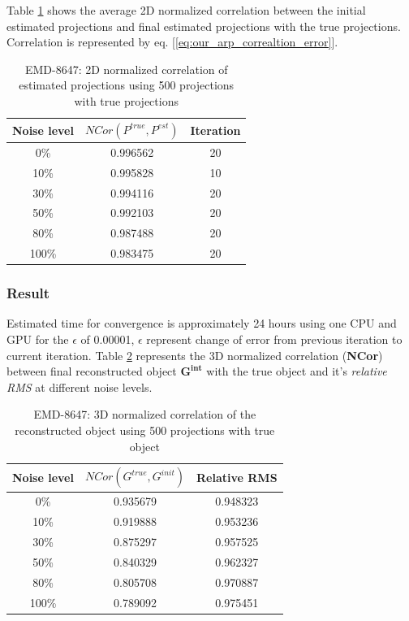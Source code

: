 \documentclass{report}
\begin{document}
Table \ref{tbl:our_shapr_8647_result-2d-correlation} shows the average 2D normalized correlation between the initial estimated projections and final estimated projections with the true projections. Correlation is represented by eq. [\ref{eq:our_arp_correaltion_error}]. 

\begin{table}[H]
    \centering
     \begin{tabular}{||c c c ||} 
             \hline
             Noise level & $ NCor(P^{true},P^{est})$ &  Iteration \\
             \hline\hline
            0\%   &0.996562 & 20 \\ \hline
            10\%  &0.995828 & 10 \\ \hline
            30\%  &0.994116 & 20 \\ \hline
            50\%  &0.992103 & 20 \\ \hline
            80\%  &0.987488 & 20 \\ \hline
            100\% &0.983475 & 20 \\ \hline
            \hline
    \end{tabular}
    \caption{EMD-8647: 2D normalized correlation of estimated projections using 500 projections with true projections }
    \label{tbl:our_shapr_8647_result-2d-correlation}
\end{table}

\subsubsection{Result}

Estimated time for convergence is approximately 24 hours using one CPU and GPU for the $\epsilon$  of 0.00001, $\epsilon$ represent change of error from previous iteration to current iteration. Table \ref{tbl:our_sharp_8674_result-3d-correlation} represents the 3D normalized correlation (\textbf{NCor}) between final reconstructed object $\boldsymbol{G^{int}}$ with the true object and it's \textit{relative RMS} at different noise levels. 

\begin{table}[H]
    \centering
     \begin{tabular}{||c c c||} 
             \hline
             Noise level & $NCor(G^{true},G^{init})$  &  Relative RMS \\ 
             \hline\hline
            0\%   &0.935679 & 0.948323 \\\hline
            10\%  &0.919888 & 0.953236 \\\hline 
            30\%  &0.875297 & 0.957525 \\\hline
            50\%  &0.840329 & 0.962327 \\\hline
            80\%  &0.805708 & 0.970887 \\\hline
            100\% &0.789092 & 0.975451 \\\hline
             \hline
    \end{tabular}
    \captionsetup{justification=centering}
    \caption{EMD-8647: 3D normalized correlation of the reconstructed object using 500 projections with true object }
    \label{tbl:our_sharp_8674_result-3d-correlation}
\end{table}
\end{document}

